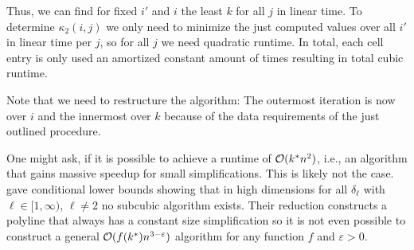 Thus, we can find for fixed \(i'\) and \(i\) the least \(k\) for all \(j\) in linear time. To determine \(\kappa_2(i, j)\) we only need to minimize the just computed values over all \(i'\) in linear time per \(j\), so for all \(j\) we need quadratic runtime. In total, each cell entry is only used an amortized constant amount of times resulting in total cubic runtime. 

Note that we need to restructure the algorithm: The outermost iteration is now over \(i\) and the innermost over \(k\) because of the data requirements of the just outlined procedure. 

One might ask, if it is possible to achieve a runtime of \(\mathcal{O}(k^*n^2)\), i.e., an algorithm that gains massive speedup for small simplifications. This is likely not the case. \citeauthor{polyline_simplification_has_cubic_complexity_bringmannetal}~\cite{polyline_simplification_has_cubic_complexity_bringmannetal} gave conditional lower bounds showing that in high dimensions for all \(\delta_\ell\) with \(\ell \in [1, \infty)\), \(\ell \neq 2\) no subcubic algorithm exists. Their reduction constructs a polyline that always has a constant size simplification so it is not even possible to construct a general \(\mathcal{O}(f(k^*)n^{3-\varepsilon})\) algorithm for any function \(f\) and \(\varepsilon > 0\).







